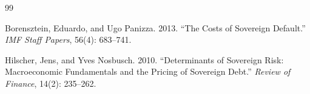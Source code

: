 \documentclass[12pt,a4paper]{article}
\begin{document}

\begin{thebibliography}{99}

Borensztein, Eduardo, and Ugo Panizza. 2013. ``The Costs of Sovereign Default.'' \textit{IMF Staff Papers}, 56(4): 683--741.

Hilscher, Jens, and Yves Nosbusch. 2010. ``Determinants of Sovereign Risk: Macroeconomic Fundamentals and the Pricing of Sovereign Debt.'' \textit{Review of Finance}, 14(2): 235--262.

\end{thebibliography}
\end{document}
